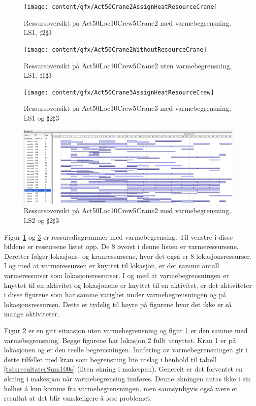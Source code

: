 \begin{figure}[!h]
\centering
\texttt{[image: content/gfx/Act50Crane2AssignHeatResourceCrane]}
\caption{Ressursoversikt på Act50Loc10Crew5Crane2 med varmebegrensning, LS1, $\sharp2\sharp3$}
\label{fig:RessursWithAct50Loc10Crew5Crane2LS1}
\end{figure}
\begin{figure}[!h]
\centering
\texttt{[image: content/gfx/Act50Crane2WithoutResourceCrane]}
\caption{Ressursoversikt på Act50Loc10Crew5Crane2 uten varmebegrensning, LS1, $\sharp1\sharp3$}
\label{fig:RessursWithoutAct50Loc10Crew5Crane2LS1}
\end{figure}
\begin{figure}[!h]
\centering
\texttt{[image: content/gfx/Act50Crane3AssignHeatResourceCrew]}
\caption{Ressursoversikt på Act50Loc10Crew5Crane3 med varmebegrensning, LS1 og $\sharp2\sharp3$}
\label{fig:RessursWithAct50Loc10Crew5Crane3LS1}
\end{figure}
\begin{figure}[!h]
\centering
\includegraphics[scale=0.3]{content/gfx/Act50Crane2LS2WithHeat}
\caption{Ressursoversikt på Act50Loc10Crew5Crane2 med varmebegrensning, LS2 og $\sharp2\sharp3$}
\label{fig:RessursWithAct50Loc10Crew5Crane2LS2}
\end{figure}
Figur \ref{fig:RessursWithAct50Loc10Crew5Crane2LS1} og \ref{fig:RessursWithAct50Loc10Crew5Crane3LS1} er ressursdiagrammer med varmebegrensing. Til venstre i disse bildene er ressursene listet opp. De 8 øverst i denne listen er varmeressursene. Deretter følger lokasjons- og kranressursene, hvor det også er 8 lokasjonsressurser. I og med at varmeressursen er knyttet til lokasjon, er det samme antall varmeressurser som lokasjonsressurser. I og med at varmebegrensningen er knyttet til en aktivitet og lokasjonene er knyttet til en aktivitet, er det aktiviteter i disse figurene som har samme varighet under varmebegrensningen og på lokasjonsressursen. Dette er tydelig til høyre på figurene hvor det ikke er så mange aktiviteter.

Figur \ref{fig:RessursWithoutAct50Loc10Crew5Crane2LS1} er en gitt situasjon uten varmebegrensning og figur \ref{fig:RessursWithAct50Loc10Crew5Crane2LS1} er den samme med varmebegrensning. Begge figurene har lokasjon 2 fullt utnyttet. Kran 1 er på lokasjonen og er den reelle begrensningen. Innføring av varmebegrensningen gir i dette tilfellet med kran som begrensning lite utslag i henhold til tabell \ref{tab:resultaterSum100s} (liten økning i makespan). Generelt er det forventet en økning i makespan når varmebegrensing innføres. Denne økningen antas ikke i sin helhet å kun komme fra varmebegrensningen, men sannsynligvis også være et resultat at det blir vanskeligere å løse problemet.

